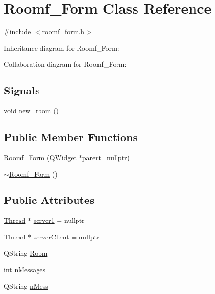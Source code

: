 \hypertarget{class_roomf___form}{}\section{Roomf\+\_\+\+Form Class Reference}
\label{class_roomf___form}


{\ttfamily \#include $<$roomf\+\_\+form.\+h$>$}



Inheritance diagram for Roomf\+\_\+\+Form\+:


Collaboration diagram for Roomf\+\_\+\+Form\+:
\subsection*{Signals}
\begin{DoxyCompactItemize}
\item 
void \mbox{\hyperlink{class_roomf___form_ad98e88a294513f6f8c5380174e738086}{new\+\_\+room}} ()
\end{DoxyCompactItemize}
\subsection*{Public Member Functions}
\begin{DoxyCompactItemize}
\item 
\mbox{\hyperlink{class_roomf___form_a50b6e25ac826e207e769f762d5d6a54c}{Roomf\+\_\+\+Form}} (Q\+Widget $\ast$parent=nullptr)
\item 
\mbox{\hyperlink{class_roomf___form_a375bc7ad1d62106b65d32760d73af1ad}{$\sim$\+Roomf\+\_\+\+Form}} ()
\end{DoxyCompactItemize}
\subsection*{Public Attributes}
\begin{DoxyCompactItemize}
\item 
\mbox{\hyperlink{class_thread}{Thread}} $\ast$ \mbox{\hyperlink{class_roomf___form_a45dc0c008f3a55cef83302046c1ece47}{server1}} = nullptr
\item 
\mbox{\hyperlink{class_thread}{Thread}} $\ast$ \mbox{\hyperlink{class_roomf___form_aeec51e8ae8159d701ea689ace5c45f06}{server\+Client}} = nullptr
\item 
Q\+String \mbox{\hyperlink{class_roomf___form_a19fcb5c555424b65791ad288225c47c4}{Room}}
\item 
int \mbox{\hyperlink{class_roomf___form_a1d86ac7246859ec80dc24d141bb9c1c7}{n\+Messages}}
\item 
Q\+String \mbox{\hyperlink{class_roomf___form_aa3b0040875c0743836134fbc61ee4ddd}{n\+Mess}}
\end{DoxyCompactItemize}


